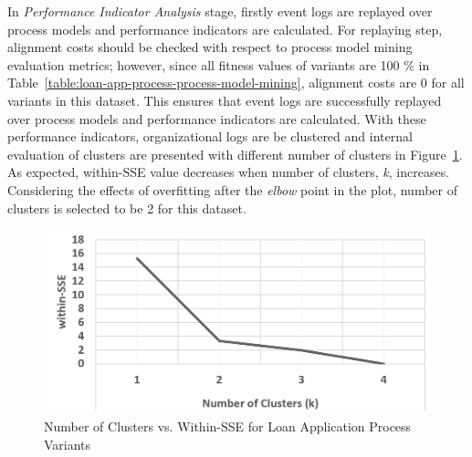 In \textit{Performance Indicator Analysis} stage, firstly event logs are replayed over process models and performance indicators are calculated. For replaying step, alignment costs should be checked with respect to process model mining evaluation metrics; however, since all fitness values of variants are 100 \% in Table~\ref{table:loan-app-process-process-model-mining}, alignment costs are 0 for all variants in this dataset. This ensures that event logs are successfully replayed over process models and performance indicators are calculated. With these performance indicators, organizational logs are be clustered and internal evaluation of clusters are presented with different number of clusters in Figure~\ref{fig:loan-cluster-sse-plot}. As expected, within-SSE value decreases when number of clusters, \textit{k}, increases. Considering the effects of overfitting after the \textit{elbow} point in the plot, number of clusters is selected to be 2 for this dataset.
\begin{figure}
	\centering
	\includegraphics[width=.7\textwidth]{5_results_discussions/loan-application-process/cluster-sse-plot}
	\caption{Number of Clusters vs. Within-SSE for Loan Application Process Variants}
  \label{fig:loan-cluster-sse-plot}
\end{figure}

